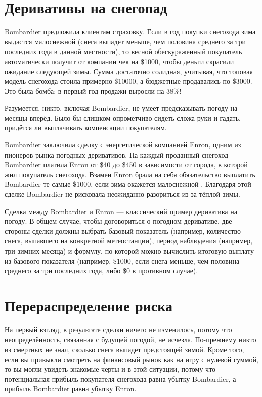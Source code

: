 \section*{Деривативы на снегопад}

Bombardier предложила клиентам страховку. Если в год покупки снегохода зима выдастся
малоснежной (снега выпадет меньше, чем половина среднего за три последних года в
данной местности), то весной обескураженный покупатель автоматически получит от компании чек
на \$\num{1000}, чтобы деньги скрасили ожидание следующей зимы. Сумма
достаточно солидная, учитывая, что топовая модель снегохода стоила примерно
\$\num{10000}, а бюджетные продавались по \$\num{3000}. Это была бомба: в
первый год продажи выросли на 38\%!

Разумеется, никто, включая Bombardier, не умеет предсказывать погоду на месяцы
вперёд. Было бы слишком опрометчиво сидеть сложа руки и гадать, придётся ли
выплачивать компенсации покупателям.

Bombardier заключила сделку с энергетической компанией Enron, одним из пионеров рынка погодных деривативов. На каждый проданный
снегоход Bombardier платила Enron от \$40 до \$450 в зависимости от города, в которой
жил покупатель снегохода. Взамен Enron брала на себя обязательство выплатить Bombardier те
самые \$\num{1000}, если зима окажется малоснежной \cite{wsj1999}. Благодаря этой сделке
Bombardier не рисковала неожиданно разориться из-за тёплой зимы. 

Сделка между Bombardier и Enron --- классический пример дериватива на погоду. В общем случае,
чтобы договориться о погодном деривативе, две стороны сделки должны выбрать
базовый показатель (например, количество снега, выпавшего на
конкретной метеостанции), период наблюдения (например, три зимних месяца) и
формулу, по которой можно вычислить итоговую выплату из базового
показателя (например, \$\num{1000}, если снега меньше, чем половина среднего за три последних года, либо \$0 в противном случае).

\section*{Перераспределение риска}

На первый взгляд, в результате сделки ничего не изменилось, потому что
неопределённость, связанная с будущей погодой, не исчезла. По-прежнему никто из
смертных не знал, сколько снега выпадет предстоящей зимой. Кроме того, если вы
привыкли смотреть на финансовый рынок как на игру с нулевой суммой, то вы могли
увидеть знакомые черты и в этой ситуации, потому что потенциальная прибыль
покупателя снегохода равна убытку Bombardier, а прибыль Bombardier равна убытку
Enron.

